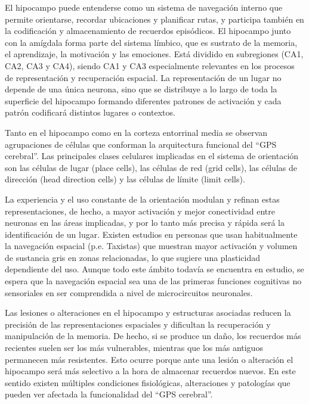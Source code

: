     El hipocampo puede entenderse como un sistema de navegación interno que permite orientarse, recordar ubicaciones y planificar rutas, y participa también en la codificación y almacenamiento de recuerdos episódicos. El hipocampo junto con la amígdala forma parte del sistema límbico, que es sustrato de la memoria, el aprendizaje, la motivación y las emociones. Está dividido en subregiones (CA1, CA2, CA3 y CA4)\cite{AnatomiaHipocampo}, siendo CA1 y CA3 especialmente relevantes en los procesos de representación y recuperación espacial. La representación de un lugar no depende de una única neurona, sino que se distribuye a lo largo de toda la superficie del hipocampo formando diferentes patrones de activación y cada patrón codificará distintos lugares o contextos.

    
    Tanto en el hipocampo como en la corteza entorrinal media se observan agrupaciones de células que conforman la arquitectura funcional del ``GPS cerebral''. Las principales clases celulares implicadas en el sistema de orientación son las células de lugar (place cells), las células de red (grid cells), las células de dirección (head direction cells) y las células de límite (limit cells). \cite{TiposCelulas_GPSCerebral}
    
    La experiencia y el uso constante de la orientación modulan y refinan estas representaciones, de hecho, a mayor activación y mejor conectividad entre neuronas en las áreas implicadas, y por lo tanto más precisa y rápida será la identificación de un lugar.  Existen estudios en personas que usan habitualmente la navegación espacial (p.e. Taxistas) que muestran mayor activación y volumen de sustancia gris en zonas relacionadas, lo que sugiere una plasticidad dependiente del uso. Aunque todo este ámbito todavía se encuentra en estudio, se espera que la navegación espacial sea una de las primeras funciones cognitivas no sensoriales en ser comprendida a nivel de microcircuitos neuronales.

    Las lesiones o alteraciones en el hipocampo y estructuras asociadas reducen la precisión de las representaciones espaciales y dificultan la recuperación y manipulación de la memoria. De hecho, si se produce un daño, los recuerdos más recientes suelen ser los más vulnerables, mientras que los más antiguos permanecen más resistentes. Esto ocurre porque ante una lesión o alteración el hipocampo será más selectivo a la hora de almacenar recuerdos nuevos. En este sentido existen múltiples condiciones fisiológicas, alteraciones y patologías que pueden ver afectada la funcionalidad del ``GPS cerebral''.

